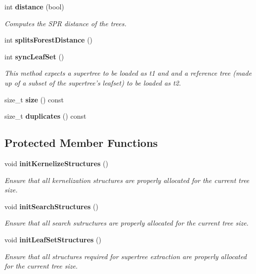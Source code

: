 \begin{CompactItemize}
int {\bf distance} (bool)
\begin{CompactList}\small\item\em Computes the SPR distance of the trees. \item\end{CompactList}\item 
int {\bf splits\-Forest\-Distance} ()
\item 
int {\bf sync\-Leaf\-Set} ()
\begin{CompactList}\small\item\em This method expects a supertree to be loaded as t1 and and a reference tree (made up of a subset of the supertree's leafset) to be loaded as t2. \item\end{CompactList}\item 
size\_\-t {\bf size} () const 
\item 
size\_\-t {\bf duplicates} () const 
\end{CompactItemize}
\subsection*{Protected Member Functions}
\begin{CompactItemize}
\item 
void {\bf init\-Kernelize\-Structures} ()
\begin{CompactList}\small\item\em Ensure that all kernelization structures are properly allocated for the current tree size. \item\end{CompactList}\item 
void {\bf init\-Search\-Structures} ()
\begin{CompactList}\small\item\em Ensure that all search sutructures are properly allocated for the current tree size. \item\end{CompactList}\item 
void {\bf init\-Leaf\-Set\-Structures} ()
\begin{CompactList}\small\item\em Ensure that all structures required for supertree extraction are properly allocated for the current tree size. \item\end{CompactList}\end{CompactItemize}
